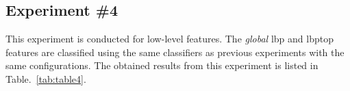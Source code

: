 



\subsection{Experiment \#4}\label{subsec:exp4}
This experiment is conducted for low-level features.
The \emph{global} \ac{lbp} and \ac{lbptop} features are classified using the same classifiers as previous experiments with the same configurations.
The obtained results from this experiment is listed in Table.~\ref{tab:table4}.\\


  



